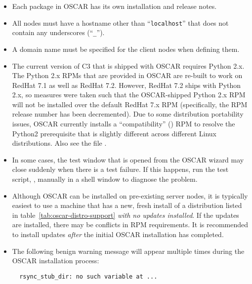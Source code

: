 \begin{itemize}
\item Each package in OSCAR has its own installation and release
  notes.   

\item All nodes must have a hostname other than ``{\tt localhost}''
  that does not contain any underscores (``{\tt \_}'').
  
\item A domain name must be specified for the client nodes when
  defining them.
  
\item The current version of C3 that is shipped with OSCAR requires
  Python 2.x.  The Python 2.x RPMs that are provided in OSCAR are
  re-built to work on RedHat 7.1 as well as RedHat 7.2.  However,
  RedHat 7.2 ships with Python 2.x, so measures were taken such that
  the OSCAR-shipped Python 2.x RPM will not be installed over the
  default RedHat 7.x RPM (specifically, the RPM release number has
  been decremented).  Due to some distribution portability issues,
  OSCAR currently installs a ``compatibility''
  () RPM to resolve the Python2
  prerequisite that is slightly different across different Linux
  distributions.  Also see the file
  .

\item In some cases, the test window that is opened from the 
  OSCAR wizard may close suddenly when there is a test failure. If
  this happens, run the test script, ,
  manually in a shell window to diagnose the problem.
  
\item Although OSCAR can be installed on pre-existing server nodes, it
  is typically easiest to use a machine that has a new, fresh install
  of a distribution listed in table~\ref{tab:oscar-distro-support}
  {\em with no updates installed}.  If the updates are installed,
  there may be conflicts in RPM requirements.  It is recommended to
  install updates {\em after} the initial OSCAR installation has
  completed.
  
\item The following benign warning message will appear multiple times
  during the OSCAR installation process:

\begin{verbatim}
  rsync_stub_dir: no such variable at ...
\end{verbatim}


\end{itemize}
